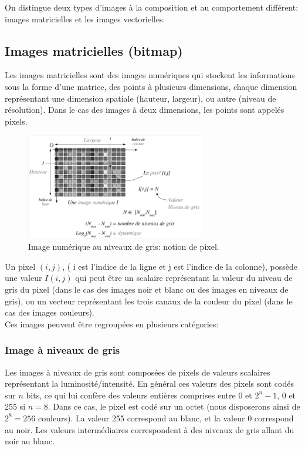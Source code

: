 On distingue deux types d'images à la composition et au comportement différent: images matricielles et les images vectorielles.

\subsection{Images matricielles (bitmap)}
Les images matricielles sont des images numériques qui stockent les informations sous la forme d'une matrice, des points à plusieurs dimensions, chaque dimension représentant une dimension spatiale (hauteur, largeur), ou autre (niveau de résolution). Dans le cas des images à deux dimensions, les points sont appelés pixels. 

\begin{figure}[H]
	\centering
	\includegraphics[width=0.7\textwidth]{Figures/pixel} 
	\caption{Image numérique au niveaux de gris: notion de pixel.}
\end{figure}


Un pixel $(i, j)$, ( i est l'indice de la ligne et j est l'indice de la colonne), possède une valeur $I(i, j)$ qui peut être un scalaire représentant la valeur du niveau de gris du pixel (dans le cas des images noir et blanc ou des images en niveaux de gris), ou un vecteur représentant les trois canaux de la couleur du pixel (dans le cas des images couleurs).\\

Ces images peuvent être regroupées en plusieurs catégories:




\subsubsection{Image à niveaux de gris}
 Les images à niveaux de gris sont composées de pixels de valeurs scalaires représentant la luminosité/intensité. En général ces valeurs des pixels sont  codés sur $n$ bits, ce qui lui confère des valeurs entières comprises entre 0 et $2^n-1$, 0 et 255 si $n = 8$. Dans ce cas, le pixel est codé sur un octet (nous disposerons ainsi de $2^8=256$ couleurs). La valeur 255 correspond au blanc, et la valeur 0 correspond au noir. Les valeurs intermédiaires correspondent à des niveaux de gris allant du noir au blanc.\\

